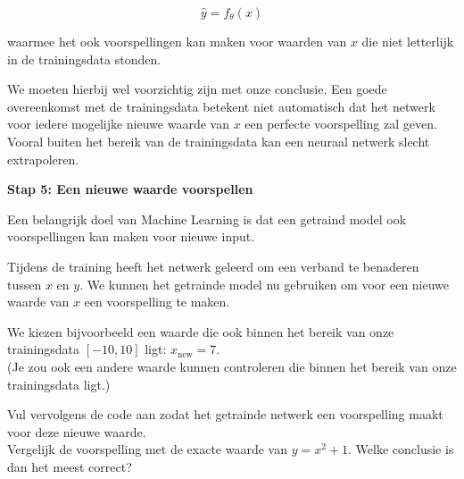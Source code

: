 \documentclass{ximera}
\begin{document}
\begin{question}
\begin{feedback}
\[
\hat y=f_\theta(x)
\]

waarmee het ook voorspellingen kan maken voor waarden van $x$ die niet letterlijk in de trainingsdata stonden.

We moeten hierbij wel voorzichtig zijn met onze conclusie. Een goede overeenkomst met de trainingsdata betekent niet automatisch dat het netwerk voor iedere mogelijke nieuwe waarde van $x$ een perfecte voorspelling zal
geven. \\
Vooral buiten het bereik van de trainingsdata kan een neuraal netwerk
slecht extrapoleren.
\end{feedback}

\end{question}

\begin{question} \textbf{Stap 5: Een nieuwe waarde voorspellen}

Een belangrijk doel van Machine Learning is dat een getraind model ook voorspellingen kan maken voor nieuwe input.

Tijdens de training heeft het netwerk geleerd om een verband te benaderen tussen $x$ en $y$. We kunnen het getrainde model nu gebruiken om voor een nieuwe waarde van $x$ een voorspelling te maken.

We kiezen bijvoorbeeld een waarde die ook binnen het bereik van onze trainingsdata $[-10, 10]$ ligt: $x_{\text{new}}=7.$ \\
(Je zou ook een andere waarde kunnen controleren die binnen het bereik van onze trainingsdata ligt.)

Vul vervolgens de code aan zodat het getrainde netwerk een voorspelling maakt voor deze nieuwe waarde. \\
Vergelijk de voorspelling met de exacte waarde van $y=x^2+1.$ Welke conclusie is dan het meest correct?

\begin{multipleChoice}





\end{multipleChoice}
\end{question}
\end{document}

